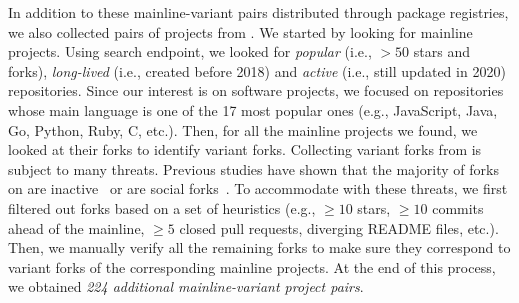In addition to these mainline-variant pairs distributed through package registries, we also collected pairs of projects from \gh.
We started by looking for mainline projects.
Using \gh search endpoint, we looked for \emph{popular} (i.e., $>50$ stars and forks), \emph{long-lived} (i.e., created before 2018) and \emph{active} (i.e., still updated in 2020) repositories. Since our interest is on software projects, we focused on repositories whose main language is one of the 17 most popular ones (e.g., \textsf{JavaScript, Java, Go, Python, Ruby, C}, etc.). 
Then, for all the mainline projects we found, we looked at their forks to identify variant forks. Collecting variant forks from \gh is subject to many threats. Previous studies have shown that the majority of forks on \gh are inactive~\cite{Businge:Android:2019,Businge:2017} or are social forks~\cite{businge:2018icsme}.
To accommodate with these threats, we first filtered out forks based on a set of heuristics (e.g., $\geq 10$ stars, $\geq 10$ commits ahead of the mainline, $\geq 5$ closed pull requests, diverging \textsf{README} files, etc.).
Then, we manually verify all the remaining forks to make sure they correspond to variant forks of the corresponding mainline projects.
At the end of this process, we obtained \textit{224 additional mainline-variant project pairs}.

